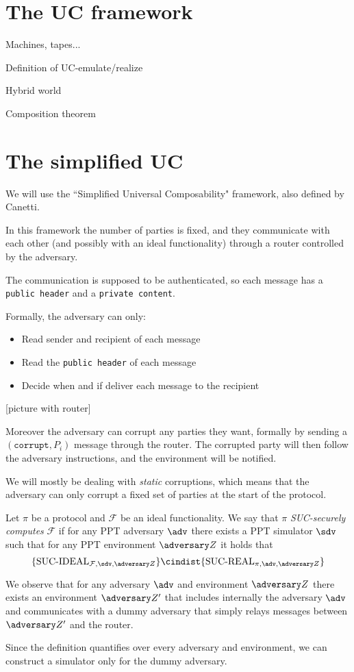 \section{The UC framework}
Machines, tapes...

Definition of UC-emulate/realize

Hybrid world

Composition theorem

\section{The simplified UC}
We will use the ``Simplified Universal Composability" framework, also defined by Canetti.

In this framework the number of parties is fixed, and they communicate with each other (and possibly with an ideal functionality) through a router controlled by the adversary.

The communication is supposed to be authenticated, so each message has a \texttt{public header} and a \texttt{private content}.

Formally, the adversary can only:
\begin{itemize}
    \item Read sender and recipient of each message
    \item Read the \texttt{public header} of each message
    \item Decide when and if deliver each message to the recipient
\end{itemize}

[picture with router]

Moreover the adversary can corrupt any parties they want, formally by sending a $(\texttt{corrupt}, P_i)$ message through the router. The corrupted party will then follow the adversary instructions, and the environment will be notified.

We will mostly be dealing with \emph{static} corruptions, which means that the adversary can only corrupt a fixed set of parties at the start of the protocol.

\begin{definition}
    Let $\pi$ be a protocol and $\mathcal F$ be an ideal functionality. We say that $\pi$ \emph{SUC-securely computes} $\mathcal F$ if for any PPT adversary $\adv$ there exists a PPT simulator $\sdv$ such that for any PPT environment $\zdv$ it holds that
    $$ \{ \text{SUC-IDEAL}_{\Fun, \sdv, \zdv} \} \cindist \{ \text{SUC-REAL}_{\pi, \adv, \zdv} \}$$
\end{definition}

We observe that for any adversary $\adv$ and environment $\zdv$ there exists an environment $\zdv'$ that includes internally the adversary $\adv$ and communicates with a dummy adversary that simply relays messages between $\zdv'$ and the router.

Since the definition quantifies over every adversary and environment, we can construct a simulator only for the dummy adversary.
